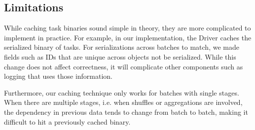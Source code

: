 \subsection{Limitations}
While caching task binaries sound simple in theory, they are more complicated to implement in practice. For example, in our implementation, the Driver caches the serialized binary of tasks. For serializations across batches to match, we made fields such as IDs that are unique across objects not be serialized. While this change does not affect correctness, it will complicate other components such as logging that uses those information.

Furthermore, our caching technique only works for batches with single stages. When there are multiple stages, i.e. when shuffles or aggregations are involved, the dependency in previous data tends to change from batch to batch, making it difficult to hit a previously cached binary.
